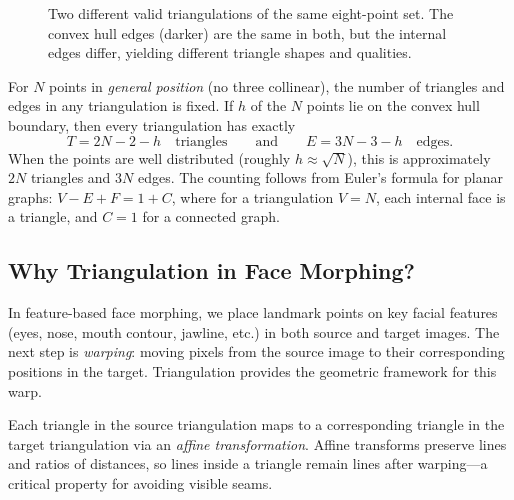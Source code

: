 \begin{figure}[htbp]
    \caption{Two different valid triangulations of the same eight-point set.
    The convex hull edges (darker) are the same in both, but the internal
    edges differ, yielding different triangle shapes and qualities.}
    \label{fig:triang-comparison}
\end{figure}

For $N$ points in \emph{general position} (no three collinear), the number of
triangles and edges in any triangulation is fixed.  If $h$ of the $N$ points lie
on the convex hull boundary, then every triangulation has exactly
\[
    T = 2N - 2 - h \quad \text{triangles}
    \qquad\text{and}\qquad
    E = 3N - 3 - h \quad \text{edges}.
\]
When the points are well distributed (roughly $h \approx \sqrt{N}$), this is
approximately $2N$ triangles and $3N$ edges.  The counting follows from Euler's
formula for planar graphs: $V - E + F = 1 + C$, where for a triangulation
$V = N$, each internal face is a triangle, and $C = 1$ for a connected graph.

\subsection{Why Triangulation in Face Morphing?}

In feature-based face morphing, we place landmark points on key facial features
(eyes, nose, mouth contour, jawline, etc.) in both source and target images.
The next step is \emph{warping}: moving pixels from the source image to their
corresponding positions in the target.  Triangulation provides the geometric
framework for this warp.

Each triangle in the source triangulation maps to a corresponding triangle in
the target triangulation via an \emph{affine transformation}.  Affine transforms
preserve lines and ratios of distances, so lines inside a triangle remain lines
after warping---a critical property for avoiding visible seams.

